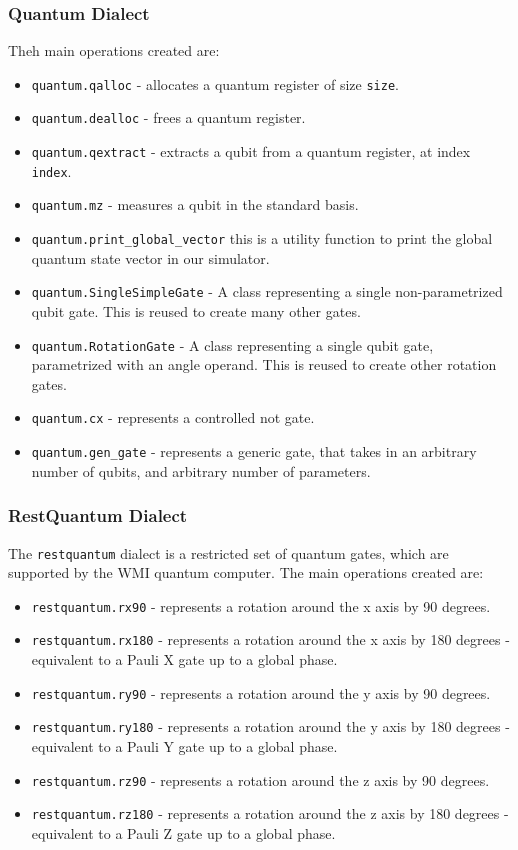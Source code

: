 \subsubsection{Quantum Dialect}
Theh main operations created are:
 \begin{itemize}
    \item \texttt{quantum.qalloc} - allocates a quantum register of size \texttt{size}.
    \item \texttt{quantum.dealloc} - frees a quantum register.
    \item \texttt{quantum.qextract} - extracts a qubit from a quantum register, at index \texttt{index}.
    \item \texttt{quantum.mz} - measures a qubit in the standard basis.
    \item \texttt{quantum.print\_global\_vector} this is a utility function to print the global quantum state vector in our simulator.
    \item \texttt{quantum.SingleSimpleGate} - A class representing a single  non-parametrized qubit gate. This is reused to create many other gates.
    \item \texttt{quantum.RotationGate} - A class representing a single qubit gate, parametrized with an angle operand. This is reused to create other rotation gates.
    \item \texttt{quantum.cx} - represents a controlled not gate.
    \item \texttt{quantum.gen\_gate} - represents a generic gate, that takes in an arbitrary number of qubits, and arbitrary number of parameters.
\end{itemize}
 \subsubsection{RestQuantum Dialect}
    The \texttt{restquantum} dialect is a restricted set of quantum gates, which are supported by the WMI quantum computer.
    The main operations created are:
    \begin{itemize}
    \item \texttt{restquantum.rx90} - represents a rotation around the x axis by 90 degrees.
    \item \texttt{restquantum.rx180} - represents a rotation around the x axis by 180 degrees - equivalent to a Pauli X gate up to a global phase.
    \item \texttt{restquantum.ry90} - represents a rotation around the y axis by 90 degrees.
    \item \texttt{restquantum.ry180} - represents a rotation around the y axis by 180 degrees - equivalent to a Pauli Y gate up to a global phase.
    \item \texttt{restquantum.rz90} - represents a rotation around the z axis by 90 degrees.
    \item \texttt{restquantum.rz180} - represents a rotation around the z axis by 180 degrees - equivalent to a Pauli Z gate up to a global phase.
    \end{itemize}


